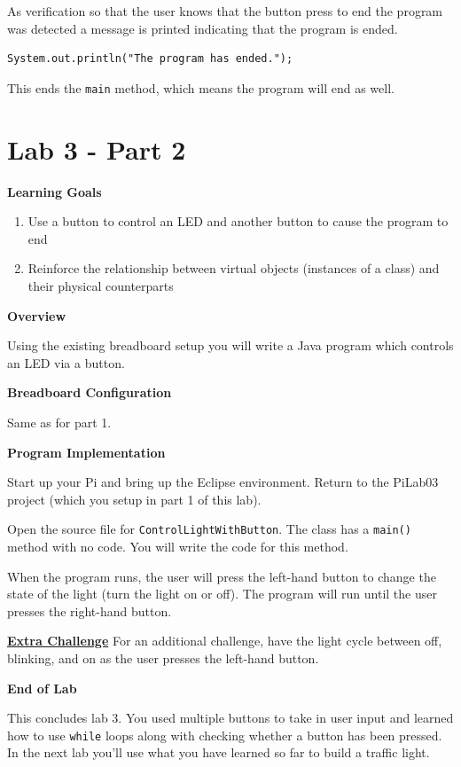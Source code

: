 As verification so that the user knows that the button press to end the program was detected a message is printed indicating that the program is ended.

\beforeverb
\begin{verbatim}
System.out.println("The program has ended.");
\end{verbatim}
\afterverb

This ends the \texttt{main} method, which means the program will end as well.

\section{Lab 3 - Part 2}

\textbf{Learning Goals}

\begin{enumerate}
	\item Use a button to control an LED and another button to cause the program to end
	\item Reinforce the relationship between virtual objects (instances of a class) and their physical counterparts
\end{enumerate}

\textbf{Overview}

Using the existing breadboard setup you will write a Java program which controls an LED via a button.

\textbf{Breadboard Configuration}

Same as for part 1.

\textbf{Program Implementation}

Start up your Pi and bring up the Eclipse environment. Return to the PiLab03 project (which you setup in part 1 of this lab).

Open the source file for \texttt{ControlLightWithButton}. The class has a \texttt{main()} method with no code. You will write the code for this method.

When the program runs, the user will press the left-hand button to change the state of the light (turn the light on or off). The program will run until the user presses the right-hand button.

\textbf{\underline{Extra Challenge}} \newline
For an additional challenge, have the light cycle between off, blinking, and on as the user presses the left-hand button.

\textbf{End of Lab}

This concludes lab 3. You used multiple buttons to take in user input and learned how to use \texttt{while} loops along with checking whether a button has been pressed. In the next lab you'll use what you have learned so far to build a traffic light.

